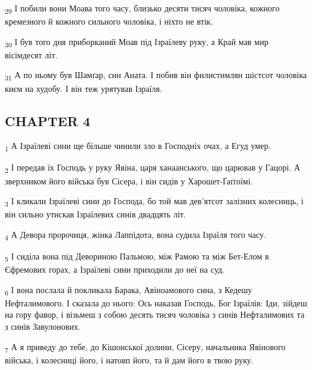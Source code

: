 \begin{tcolorbox}
\textsubscript{29} І побили вони Моава того часу, близько десяти тисяч чоловіка, кожного кремезного й кожного сильного чоловіка, і ніхто не втік.
\end{tcolorbox}
\begin{tcolorbox}
\textsubscript{30} І був того дня приборканий Моав під Ізраїлеву руку, а Край мав мир вісімдесят літ.
\end{tcolorbox}
\begin{tcolorbox}
\textsubscript{31} А по ньому був Шамґар, син Аната. І побив він филистимлян шістсот чоловіка києм на худобу. І він теж урятував Ізраїля.
\end{tcolorbox}
\subsection{CHAPTER 4}
\begin{tcolorbox}
\textsubscript{1} А Ізраїлеві сини ще більше чинили зло в Господніх очах, а Егуд умер.
\end{tcolorbox}
\begin{tcolorbox}
\textsubscript{2} І передав їх Господь у руку Явіна, царя ханаанського, що царював у Гацорі. А зверхником його війська був Сісера, і він сидів у Харошет-Ґаґґоїмі.
\end{tcolorbox}
\begin{tcolorbox}
\textsubscript{3} І кликали Ізраїлеві сини до Господа, бо той мав дев'ятсот залізних колесниць, і він сильно утискав Ізраїлевих синів двадцять літ.
\end{tcolorbox}
\begin{tcolorbox}
\textsubscript{4} А Девора пророчиця, жінка Лаппідота, вона судила Ізраїля того часу.
\end{tcolorbox}
\begin{tcolorbox}
\textsubscript{5} І сиділа вона під Девориною Пальмою, між Рамою та між Бет-Елом в Єфремових горах, а Ізраїлеві сини приходили до неї на суд.
\end{tcolorbox}
\begin{tcolorbox}
\textsubscript{6} І вона послала й покликала Барака, Авіноамового сина, з Кедешу Нефталимового. І сказала до нього: Ось наказав Господь, Бог Ізраїлів: Іди, зійдеш на гору фавор, і візьмеш з собою десять тисяч чоловіка з синів Нефталимових та з синів Завулонових.
\end{tcolorbox}
\begin{tcolorbox}
\textsubscript{7} А я приведу до тебе, до Кішонської долини, Сісеру, начальника Явінового війська, і колесниці його, і натовп його, та й дам його в твою руку.
\end{tcolorbox}
